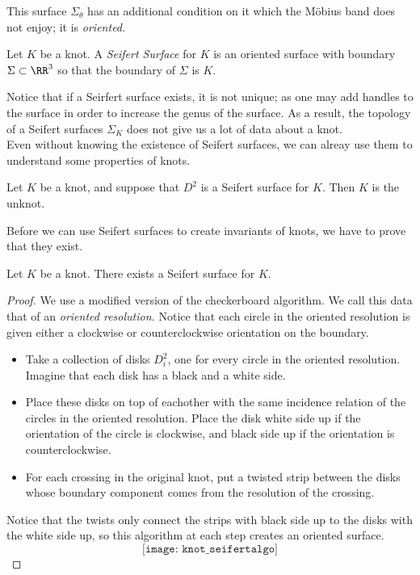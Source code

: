 This surface $\Sigma_\theta$ has an additional condition on it which the M\"obius band does not enjoy; it is \emph{oriented.}

\begin{definition}
Let $K$ be a knot. A \emph{Seifert Surface} for $K$ is an oriented surface with boundary $\Sigma\subset \RR^3$ so that the boundary of $\Sigma$ is $K$. 
\end{definition}
Notice that if a Seirfert surface exists, it is not unique; as one may add handles to the surface in order to increase the genus of the surface. As a result, the topology of a Seifert surfaces $\Sigma_K$ does not give us a lot of data about a knot. \\
Even without knowing the existence of Seifert surfaces, we can alreay use them to understand some properties of knots. 
\begin{claim}
Let $K$ be a knot, and suppose that $D^2$ is a Seifert surface for $K$. Then $K$ is the unknot.
\end{claim}
Before we can use Seifert surfaces to create invariants of knots, we have to prove that they exist. 
\begin{theorem}
Let $K$ be a knot. There exists a Seifert surface for $K$. 
\end{theorem}
\begin{proof}
We use a modified version of the checkerboard algorithm.
 We call this data that of an \emph{oriented resolution.} Notice that each circle in the oriented resolution is given either a clockwise or counterclockwise orientation on the boundary. \\
\begin{itemize}
\item Take a collection of disks $D^2_i$, one for every circle in the oriented resolution. Imagine that each disk has a black and a white side.
\item Place these disks on top of eachother with the same incidence relation of the circles in the oriented resolution. Place the disk white side up if the orientation of the circle is clockwise, and black side up if the orientation is counterclockwise.
\item  For each crossing  in the original knot, put a twisted strip between the disks whose boundary component comes from the resolution of the crossing.
\end{itemize}
Notice that the twists only connect the strips with black side up to the disks with the white side up, so this algorithm at each step creates an oriented surface. 
\[\texttt{[image: knot\_seifertalgo]}\]
\end{proof}
